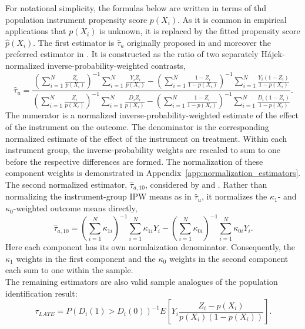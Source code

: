 \documentclass[12pt, a4paper, oneside]{article}
\theoremstyle{plain}
\theoremstyle{definition}
\begin{document}
For notational simplicity, the formulas below are written in terms of thd population instrument propensity score $p(X_i)$. As it is common in empirical applications that $p(X_i)$ is unknown, it is replaced by the fitted propensity score $\hat p(X_i)$.
The first estimator is  $\hat\tau_u$ originally proposed in \citep{uysal2011three} and moreover the preferred estimator in \citet{sloczynski2025abadie}. 
It is constructed as 
the ratio of two separately Hájek-normalized inverse-probability-weighted
contrasts,
\begin{equation}
    \hat\tau_u =
    \frac{
        \left(\sum_{i=1}^N \frac{Z_i}{p(X_i)}\right)^{-1}\sum_{i=1}^N \frac{Y_iZ_i}{p(X_i)}
        -
        \left(\sum_{i=1}^N \frac{1-Z_i}{1-p(X_i)}\right)^{-1}\sum_{i=1}^N \frac{Y_i(1-Z_i)}{1-p(X_i)}
    }{
        \left(\sum_{i=1}^N \frac{Z_i}{p(X_i)}\right)^{-1}\sum_{i=1}^N \frac{D_iZ_i}{p(X_i)}
        -
        \left(\sum_{i=1}^N \frac{1-Z_i}{1-p(X_i)}\right)^{-1}\sum_{i=1}^N \frac{D_i(1-Z_i)}{1-p(X_i)}
    }.
    \label{eq:tau_u}
\end{equation}
The numerator is a normalized inverse-probability-weighted estimate of the effect of the instrument on the outcome.
The denominator is the corresponding normalized estimate of the effect of the instrument on treatment. Within each instrument group, the inverse-probability weights are rescaled to sum to one before the respective differences are formed. The normalization of these component weights is demonstrated in Appendix~\ref{app:normalization_estimators}.\\
The second normalized estimator, $\hat\tau_{a,10}$, considered by \citet{abadie2018econometric} and \citet{sant2022covariate}. Rather than normalizing the instrument-group IPW means as in \(\hat\tau_u\),
it normalizes the \(\kappa_1\)- and \(\kappa_0\)-weighted outcome means directly,
\begin{equation}
    \hat\tau_{a,10} =
    \left(\sum_{i=1}^N \kappa_{1i}\right)^{-1}\sum_{i=1}^N \kappa_{1i}Y_i
    -
    \left(\sum_{i=1}^N \kappa_{0i}\right)^{-1}\sum_{i=1}^N \kappa_{0i}Y_i.
    \label{eq:tau_a10}
\end{equation}
Here each component has its own normlaization denominator. 
Consequently, the $\kappa_1$ weights in the first component and the $\kappa_0$ weights in the second component each sum to one within the sample.\\
The remaining estimators are also valid sample analogues of the population identification result:
\[
\tau_{LATE}
= P(D_i(1)>D_i(0))^{-1}
E\!\left[
Y_i\frac{Z_i-p(X_i)}{p(X_i)(1-p(X_i))}
\right].
\]
\end{document}
